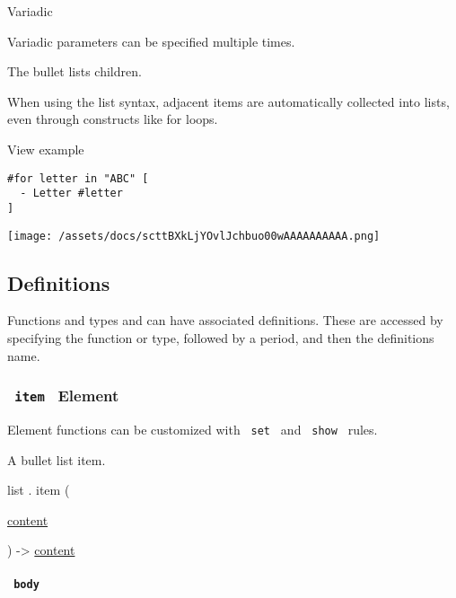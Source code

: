 {{ Variadic }}

\label{parameters-children-variadic-tooltip}
Variadic parameters can be specified multiple times.

The bullet list\textquotesingle s children.

When using the list syntax, adjacent items are automatically collected
into lists, even through constructs like for loops.


View example

\begin{verbatim}
#for letter in "ABC" [
  - Letter #letter
]
\end{verbatim}

\texttt{[image: /assets/docs/scttBXkLjYOvlJchbuo00wAAAAAAAAAA.png]}

\subsection{\texorpdfstring{{ Definitions
}}{ Definitions }}\label{definitions}

\label{definitions-tooltip}
Functions and types and can have associated definitions. These are
accessed by specifying the function or type, followed by a period, and
then the definition\textquotesingle s name.

\subsubsection{\texorpdfstring{\texttt{\ item\ } {{ Element
}}}{ item   Element }}\label{definitions-item}

\label{definitions-item-element-tooltip}
Element functions can be customized with \texttt{\ set\ } and
\texttt{\ show\ } rules.

A bullet list item.

list { . } { item } (

{ \href{/docs/reference/foundations/content/}{content} }

) -\textgreater{} \href{/docs/reference/foundations/content/}{content}

\paragraph{\texorpdfstring{\texttt{\ body\ }}{ body }}\label{definitions-item-body}

